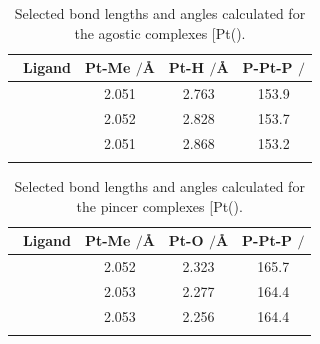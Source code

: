 \begin{table}[htp]
\caption[Selected bond lengths and angles for [Pt(\tBuxantphos)\ce{Me{]}+}]{Selected bond lengths and angles calculated for the agostic complexes [Pt(\tBuxantphos)\ce{Me]+}.}
\vspace{1em}
\label{table:PtMeagostic}
\small
\begin{center}
\begin{tabular}{l c c c}
	\toprule
	~\bfseries{Ligand} & \bfseries{Pt-Me $/$\si{\angstrom}} & \bfseries{Pt-H $/$\si{\angstrom}}& \bfseries{P-Pt-P $/$\degrees{}} \\
	\midrule		
	~\tBuSixantphos	& 2.051	& 2.763 	& 153.9	\\
	~\tBuThixantphos	& 2.052	& 2.828 	& 153.7 	\\
	~\tBuXantphos{}	& 2.051	& 2.868	& 153.2	\\ 
	\bottomrule{}
\end{tabular}
\end{center}
\end{table}

\begin{table}[htp]
\caption[Selected bond lengths and angles for [Pt(\tBuxantphosk)\ce{Me{]}+}]{Selected bond lengths and angles calculated for the pincer complexes [Pt(\tBuxantphosk)\ce{Me]+}.}
\vspace{1em}
\label{table:PtMepincer}
\small
\begin{center}
\begin{tabular}{l c c c}
	\toprule
	~\bfseries{Ligand} & \bfseries{Pt-Me $/$\si{\angstrom}} & \bfseries{Pt-O $/$\si{\angstrom}} & \bfseries{P-Pt-P $/$\degrees{}} \\
	\midrule		
	~\tBuSixantphos	& 2.052	& 2.323 	& 165.7 \\
	~\tBuThixantphos	& 2.053	& 2.277	& 164.4 \\
	~\tBuXantphos{}	& 2.053	& 2.256	& 164.4 \\ 
	\bottomrule{}
\end{tabular}
\end{center}
\end{table}

